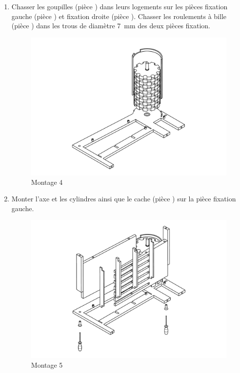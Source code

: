 \begin{enumerate}
\item Chasser les goupilles (pièce ) dans leurs logements sur les pièces fixation gauche (pièce ) et fixation droite (pièce ). Chasser les roulements à bille (pièce ) dans les trous de diamètre \SI{7}{\mm} des deux pièces fixation.

\newpage

\begin{figure}
    \centering
    \includegraphics[width=\textwidth]{Graphics/Montage/4.pdf}
    \caption{Montage 4}
    \label{fig:Montage4}
\end{figure}

\item Monter l'axe et les cylindres ainsi que le cache (pièce ) sur la pièce fixation gauche.

\newpage

\begin{figure}
    \centering
    \includegraphics[width=\textwidth]{Graphics/Montage/5.pdf}
    \caption{Montage 5}
    \label{fig:Montage5}
\end{figure}


\end{enumerate}
